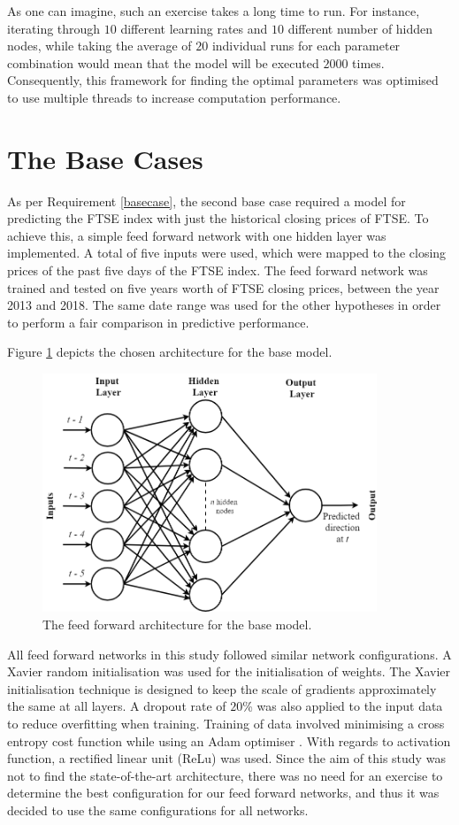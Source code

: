 \documentclass{UoYCSproject}
\begin{document}
As one can imagine, such an exercise takes a long time to run. For instance, iterating through $10$ different learning rates and $10$ different number of hidden nodes, while taking the average of $20$ individual runs for each parameter combination would mean that the model will be executed $2000$ times. Consequently, this framework for finding the optimal parameters was optimised to use multiple threads to increase computation performance.   

\section{The Base Cases}
\label{sec:thebasecase}
As per Requirement \ref{basecase}, the second base case required a model for predicting the FTSE index with just the historical closing prices of FTSE.  To achieve this, a simple feed forward network with one hidden layer was implemented. A total of five inputs were used, which were mapped to the closing prices of the past five days of the FTSE index. The feed forward network was trained and tested on five years worth of FTSE closing prices, between the year 2013 and 2018. The same date range was used for the other hypotheses in order to perform a fair comparison in predictive performance.

Figure \ref{fig:basecase} depicts the chosen architecture for the base model. 

\begin{figure}[h]
\includegraphics[width=10cm]{Base_case_diagram.png}
\centering
\caption{The feed forward architecture for the base model.} 
\label{fig:basecase}
\end{figure}

All feed forward networks in this study followed similar network configurations. A Xavier \cite{glorot2010understanding} random initialisation was used for the initialisation of weights. The Xavier initialisation technique is designed to keep the scale of gradients approximately the same at all layers. A dropout rate of $20$\% was also applied to the input data to reduce overfitting when training. Training of data involved minimising a cross entropy cost function while using an Adam optimiser \cite{kingma2014adam}. With regards to activation function, a rectified linear unit (ReLu) was used. Since the aim of this study was not to find the state-of-the-art architecture, there was no need for an exercise to determine the best configuration for our feed forward networks, and thus it was decided to use the same configurations for all networks. 
\end{document}

